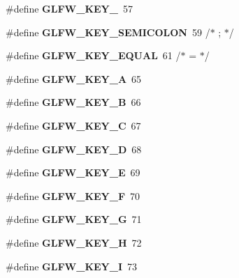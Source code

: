 \begin{DoxyCompactItemize}
\#define {\bfseries G\+L\+F\+W\+\_\+\+K\+E\+Y\+\_}~57
\item 
\mbox{\label{group__keys_ga84233de9ee5bb3e8788a5aa07d80af7d}} 
\#define {\bfseries G\+L\+F\+W\+\_\+\+K\+E\+Y\+\_\+\+S\+E\+M\+I\+C\+O\+L\+ON}~59  /$\ast$ ; $\ast$/
\item 
\mbox{\label{group__keys_gae1a2de47240d6664423c204bdd91bd17}} 
\#define {\bfseries G\+L\+F\+W\+\_\+\+K\+E\+Y\+\_\+\+E\+Q\+U\+AL}~61  /$\ast$ = $\ast$/
\item 
\mbox{\label{group__keys_ga03e842608e1ea323370889d33b8f70ff}} 
\#define {\bfseries G\+L\+F\+W\+\_\+\+K\+E\+Y\+\_\+A}~65
\item 
\mbox{\label{group__keys_ga8e3fb647ff3aca9e8dbf14fe66332941}} 
\#define {\bfseries G\+L\+F\+W\+\_\+\+K\+E\+Y\+\_\+B}~66
\item 
\mbox{\label{group__keys_ga00ccf3475d9ee2e679480d540d554669}} 
\#define {\bfseries G\+L\+F\+W\+\_\+\+K\+E\+Y\+\_\+C}~67
\item 
\mbox{\label{group__keys_ga011f7cdc9a654da984a2506479606933}} 
\#define {\bfseries G\+L\+F\+W\+\_\+\+K\+E\+Y\+\_\+D}~68
\item 
\mbox{\label{group__keys_gabf48fcc3afbe69349df432b470c96ef2}} 
\#define {\bfseries G\+L\+F\+W\+\_\+\+K\+E\+Y\+\_\+E}~69
\item 
\mbox{\label{group__keys_ga5df402e02aca08444240058fd9b42a55}} 
\#define {\bfseries G\+L\+F\+W\+\_\+\+K\+E\+Y\+\_\+F}~70
\item 
\mbox{\label{group__keys_gae74ecddf7cc96104ab23989b1cdab536}} 
\#define {\bfseries G\+L\+F\+W\+\_\+\+K\+E\+Y\+\_\+G}~71
\item 
\mbox{\label{group__keys_gad4cc98fc8f35f015d9e2fb94bf136076}} 
\#define {\bfseries G\+L\+F\+W\+\_\+\+K\+E\+Y\+\_\+H}~72
\item 
\mbox{\label{group__keys_ga274655c8bfe39742684ca393cf8ed093}} 
\#define {\bfseries G\+L\+F\+W\+\_\+\+K\+E\+Y\+\_\+I}~73

\end{DoxyCompactItemize}
